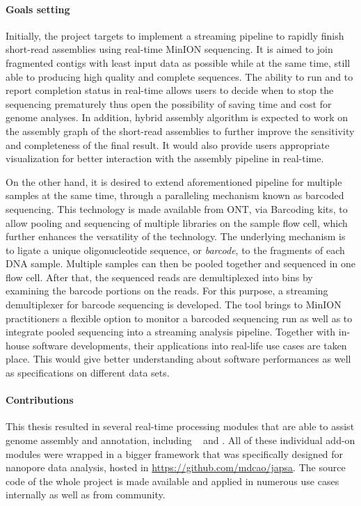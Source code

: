 \paragraph{Goals setting} Initially, the project targets to implement a streaming pipeline to rapidly finish short-read assemblies using real-time MinION sequencing. 
It is aimed to join fragmented contigs with least input data as possible while at the same time, still able to producing high quality and complete sequences. 
The ability to run and to report completion status in real-time allows users to decide when to stop the sequencing prematurely thus open the possibility of saving time and cost for genome analyses.
In addition, hybrid assembly algorithm is expected to work on the assembly graph of the short-read assemblies to further improve the sensitivity and completeness of the final result. It would also provide users appropriate visualization for better interaction with the assembly pipeline in real-time.

On the other hand, it is desired to extend aforementioned pipeline for multiple samples at the same time, through a paralleling mechanism known as barcoded sequencing.
This technology is made available from ONT, via Barcoding kits, to allow pooling and sequencing of multiple libraries on the sample flow cell, which further enhances the versatility of the technology. The underlying mechanism is to ligate a unique oligonucleotide sequence, or \emph{barcode}, to the fragments of each DNA sample. Multiple samples can then be pooled together and sequenced in one flow cell. After that, the sequenced reads are demultiplexed into bins by examining the barcode portions on the reads. 
For this purpose, a streaming demultiplexer for barcode sequencing is developed.
The tool brings to MinION practitioners a flexible option to monitor a barcoded sequencing run as well as to integrate pooled sequencing into a streaming analysis pipeline.
Together with in-house software developments, their applications into real-life use cases are taken place. This would give better understanding about software performances as well as specifications on different data sets.

\paragraph{Contributions} 
This thesis resulted in several real-time processing modules that are able to assist genome assembly and annotation, including \npscarf{}~\cite{Cao2017scaffolding} \npbarcode{}\cite{Nguyen2017barcode} and \npgraph{}. 
All of these individual add-on modules were wrapped in a bigger framework that was specifically designed for nanopore data analysis, hosted in \url{https://github.com/mdcao/japsa}.
The source code of the whole project is made available and applied in numerous use cases internally as well as from community. 

